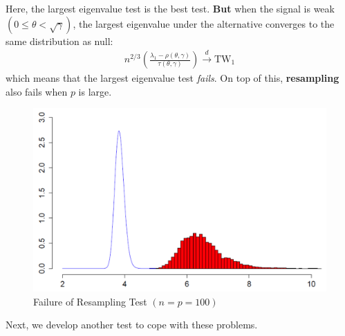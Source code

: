 \documentclass[twoside]{article}
\begin{document}
Here, the largest eigenvalue test is the best test. \textbf{But} when the signal is weak $(0 \leq \theta < \sqrt{\gamma})$, the largest eigenvalue under the alternative converges to the same distribution as null: 
\begin{align*}
    n^{2/3} \left( \frac{\lambda_1 - \rho(\theta,\gamma)}{\tau (\theta,\gamma)} \right) \xrightarrow{d} \mathrm{TW}_1
\end{align*}
which means that the largest eigenvalue test \textit{fails}. On top of this, \textbf{resampling} also fails when $p$ is large.
\begin{figure}[ht]
    \centering
    \includegraphics[width = 0.6 \textwidth]{figures/note18_resamplingfail.png}
    \caption{Failure of Resampling Test $(n=p=100)$}\label{fig:resampling_failure}
\end{figure}

Next, we develop another test to cope with these problems.
\end{document}
